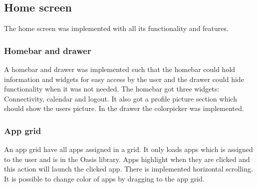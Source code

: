 \subsection{Home screen}
\label{backlog:home_screen}

The home screen was implemented with all its functionality and features.

\subsubsection{Homebar and drawer}
\label{backlog:homebar_drawer}

A homebar and drawer was implemented such that the homebar could hold information and widgets for easy access by the user and the drawer could hide functionality when it was not needed. The homebar got three widgets: Connectivity, calendar and logout. It also got a profile picture section which should show the users picture. In the drawer the colorpicker was implemented.

\subsubsection{App grid}
\label{backlog:appgrid}

An app grid have all apps assigned in a grid. It only loads \giraf[] apps which is assigned to the user and is in the Oasis library. Apps highlight when they are clicked and this action will launch the clicked app. There is implemented horizontal scrolling. It is possible to change color of apps by dragging to the app grid.
